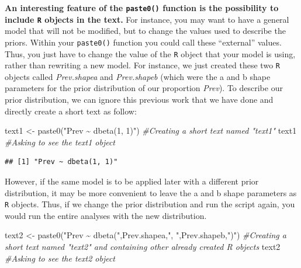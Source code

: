 \documentclass[
]{book}
\newenvironment{Shaded}{\begin{snugshade}}{\end{snugshade}}
\newcommand{\CommentTok}[1]{\textcolor[rgb]{0.56,0.35,0.01}{\textit{#1}}}
\newcommand{\FunctionTok}[1]{\textcolor[rgb]{0.00,0.00,0.00}{#1}}
\newcommand{\NormalTok}[1]{#1}
\newcommand{\OtherTok}[1]{\textcolor[rgb]{0.56,0.35,0.01}{#1}}
\newcommand{\StringTok}[1]{\textcolor[rgb]{0.31,0.60,0.02}{#1}}
\begin{document}
\textbf{An interesting feature of the \texttt{paste0()} function is the
possibility to include \texttt{R} objects in the text.} For instance,
you may want to have a general model that will not be modified, but to
change the values used to describe the priors. Within your
\texttt{paste0()} function you could call these ``external'' values.
Thus, you just have to change the value of the \texttt{R} object that
your model is using, rather than rewriting a new model. For instance, we
just created these two \texttt{R} objects called \emph{Prev.shapea} and
\emph{Prev.shapeb} (which were the a and b shape parameters for the
prior distribution of our proportion \emph{Prev}). To describe our prior
distribution, we can ignore this previous work that we have done and
directly create a short text as follow:

\begin{Shaded}
\begin{Highlighting}[]
\NormalTok{text1 }\OtherTok{\textless{}{-}} \FunctionTok{paste0}\NormalTok{(}\StringTok{"Prev \textasciitilde{} dbeta(1, 1)"}\NormalTok{)       }\CommentTok{\#Creating a short text named "text1"}
\NormalTok{text1                                       }\CommentTok{\#Asking to see the text1 object}
\end{Highlighting}
\end{Shaded}

\begin{verbatim}
## [1] "Prev ~ dbeta(1, 1)"
\end{verbatim}

However, if the same model is to be applied later with a different prior
distribution, it may be more convenient to leave the a and b shape
parameters as \texttt{R} objects. Thus, if we change the prior
distribution and run the script again, you would run the entire analyses
with the new distribution.

\begin{Shaded}
\begin{Highlighting}[]
\NormalTok{text2 }\OtherTok{\textless{}{-}} \FunctionTok{paste0}\NormalTok{(}\StringTok{"Prev \textasciitilde{} dbeta("}\NormalTok{,Prev.shapea,}\StringTok{", "}\NormalTok{,Prev.shapeb,}\StringTok{")"}\NormalTok{)            }\CommentTok{\#Creating a short text named "text2" and containing other already created R objects}
\NormalTok{text2                                                                        }\CommentTok{\#Asking to see the text2 object}
\end{Highlighting}
\end{Shaded}
\end{document}
